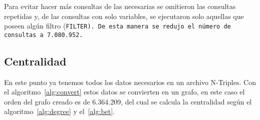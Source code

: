 Para evitar hacer más consultas de las necesarias se omitieron las consultas
repetidas y, de las consultas con solo variables, se ejecutaron solo aquellas
que poseen algún filtro (\tt{FILTER}). De esta manera se redujo el número de
consultas a 7.080.952.



\subsection{Centralidad}\label{sec:res:cent}
En este punto ya tenemos todos los datos necesarios en un archivo N-Triples. Con
el algoritmo~\ref{alg:convert} estos datos se convierten en un grafo, en este
caso el orden del grafo creado es de 6.364.209, del cual se calcula la
centralidad según el algoritmo~\ref{alg:degree} y el~\ref{alg:bet}.


